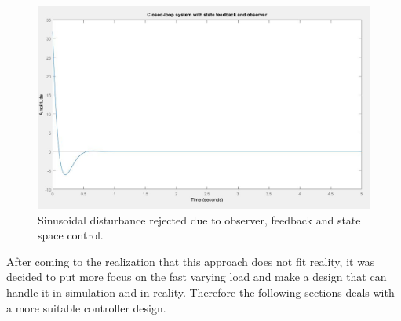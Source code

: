 \begin{figure}[H]
\centering
\includegraphics[width=1.1\textwidth]{rapport/billeder/temporary/eliminated_disturbance}
\caption{Sinusoidal disturbance rejected due to observer, feedback and state space control.}
\label{fig:sin_disturbance_reject}
\end{figure}

After coming to the realization that this approach does not fit reality, it was decided to put more focus on the fast varying load and make a design that can handle it in simulation and in reality. Therefore the following sections deals with a more suitable controller design. 